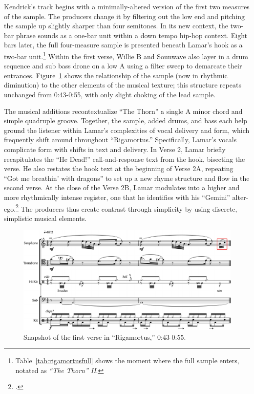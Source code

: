 Kendrick's track begins with a minimally-altered version of the first two measures of the 
sample. The producers change it by filtering out the low end and pitching the sample up 
slightly  sharper than four semitones. In its new context, the two-bar phrase sounds as a
one-bar unit within a down tempo hip-hop context. Eight bars later, the full four-measure
sample is presented beneath Lamar's hook as a two-bar unit.\footnote{
    Table~\ref{tab:rigamortusfull} shows the moment where the full sample enters, notated
    as \textit{``The Thorn'' II}.}
Within the first verse, Willie B and Sounwave also layer in a drum sequence and sub bass 
drone on a low A using a filter sweep to demarcate their entrances. 
Figure~\ref{fig:rigamortusnoslip} shows the relationship of the sample (now in rhythmic
diminution) to the other elements of the musical texture; this structure repeats unchanged 
from 0:43-0:55, with only slight choking of the lead sample.

The musical additions recontextualize ``The Thorn'' a single A minor chord and simple quadruple
groove. Together, the sample, added drums, and bass each help ground the listener within Lamar's
complexities of vocal delivery and form, which frequently shift around throughout ``Rigamortus.''
Specifically, Lamar's vocals complicate form with shifts in text and delivery. In Verse 2, Lamar
briefly recapitulates the ``He Dead!'' call-and-response text from the hook, bisecting the verse.
He also restates the hook text at the beginning of Verse 2A, repeating ``Got me breathin' with 
dragons'' to set up a new rhyme structure and flow in the second verse. At the close of the Verse
2B, Lamar modulates into a higher and more rhythmically intense register, one that he identifies with 
his ``Gemini'' alter-ego.\footnote{
    \cite{chrismenchTrackingManyVoices2017}.}
The producers thus create contrast through simplicity by using discrete, simplistic musical elements.

\begin{figure}[ht]
    \centering
    \includegraphics[width=\textwidth]{images/figures/chp 02/043053rigamortusnoslip.pdf}
    \caption{Snapshot of the first verse in ``Rigamortus,'' 0:43-0:55.}
    \label{fig:rigamortusnoslip}
\end{figure}

